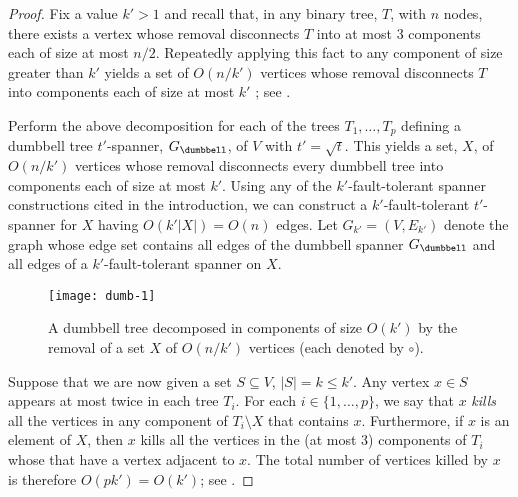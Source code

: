 \documentclass{patmorin}
\begin{document}
\begin{proof} 
  Fix a value $k'>1$ and recall that, in any binary tree, $T$, with $n$
  nodes, there exists a vertex whose removal disconnects $T$ into at most
  3 components each of size at most $n/2$.  Repeatedly applying this fact
  to any component of size greater than $k'$ yields a set of $O(n/k')$
  vertices whose removal disconnects $T$ into components each of size
  at most $k'$ \cite[Lemma~12.1.5]{ns07}; see .

  Perform the above decomposition for each of the trees $T_1,\ldots,T_p$
  defining a dumbbell tree $t'$-spanner, $G_\dumbbell$, of $V$ with
  $t'=\sqrt{t}$.  This yields a set, $X$, of $O(n/k')$ vertices
  whose removal disconnects every dumbbell tree into components
  each of size at most $k'$.  Using any of the $k'$-fault-tolerant
  spanner constructions cited in the introduction, we can construct a
  $k'$-fault-tolerant $t'$-spanner for $X$ having $O(k'|X|)=O(n)$ edges.
  Let $G_{k'}=(V,E_{k'})$ denote the graph whose edge set contains
  all edges of the dumbbell spanner $G_\dumbbell$ and all edges of a
  $k'$-fault-tolerant spanner on $X$.

  \begin{figure}
    \begin{center}
      \texttt{[image: dumb-1]}
    \end{center}
    \caption{A dumbbell tree decomposed in components of size $O(k')$
    by the removal of a set $X$ of $O(n/k')$ vertices (each denoted
    by $\circ$).}
  \end{figure}

  Suppose that we are now given a set $S\subseteq V$, $|S|=k\le k'$.
  Any vertex $x\in S$ appears at most twice in each tree $T_i$.  For each
  $i\in\{1,\ldots,p\}$, we say that $x$ \emph{kills} all the vertices
  in any component of $T_i\setminus X$ that contains $x$.  Furthermore,
  if $x$ is an element of $X$, then $x$ kills all the vertices in the (at
  most 3) components of $T_i$ whose that have a vertex adjacent to $x$.
  The total number of vertices killed by $x$ is therefore $O(pk')=O(k')$;
  see .


\end{proof}
\end{document}
